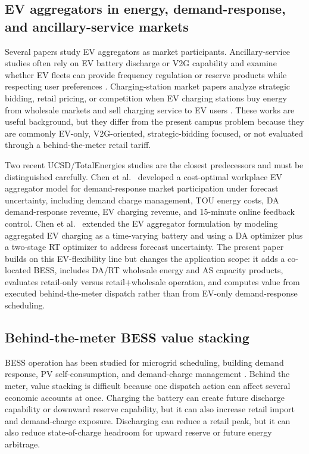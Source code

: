 \documentclass[final,5p,times]{elsarticle}
\begin{document}
\subsection{EV aggregators in energy, demand-response, and ancillary-service markets}
Several papers study EV aggregators as market participants. Ancillary-service studies often rely on EV battery discharge or V2G capability and examine whether EV fleets can provide frequency regulation or reserve products while respecting user preferences \cite{clairand2020ancillary,sortomme2012v2gAncillary}. Charging-station market papers analyze strategic bidding, retail pricing, or competition when EV charging stations buy energy from wholesale markets and sell charging service to EV users \cite{mousavi2022evcsWholesale,bayani2021strategic}. These works are useful background, but they differ from the present campus problem because they are commonly EV-only, V2G-oriented, strategic-bidding focused, or not evaluated through a behind-the-meter retail tariff.

Two recent UCSD/TotalEnergies studies are the closest predecessors and must be distinguished carefully. Chen et al.~\cite{chen2024costoptimal} developed a cost-optimal workplace EV aggregator model for demand-response market participation under forecast uncertainty, including demand charge management, TOU energy costs, DA demand-response revenue, EV charging revenue, and 15-minute online feedback control. Chen et al.~\cite{chen2026realtime} extended the EV aggregator formulation by modeling aggregated EV charging as a time-varying battery and using a DA optimizer plus a two-stage RT optimizer to address forecast uncertainty. The present paper builds on this EV-flexibility line but changes the application scope: it adds a co-located BESS, includes DA/RT wholesale energy and AS capacity products, evaluates retail-only versus retail+wholesale operation, and computes value from executed behind-the-meter dispatch rather than from EV-only demand-response scheduling.

\subsection{Behind-the-meter BESS value stacking}
BESS operation has been studied for microgrid scheduling, building demand response, PV self-consumption, and demand-charge management \cite{parisio2014model,wang2018predictive,raoufat2017bess}. Behind the meter, value stacking is difficult because one dispatch action can affect several economic accounts at once. Charging the battery can create future discharge capability or downward reserve capability, but it can also increase retail import and demand-charge exposure. Discharging can reduce a retail peak, but it can also reduce state-of-charge headroom for upward reserve or future energy arbitrage.
\end{document}
